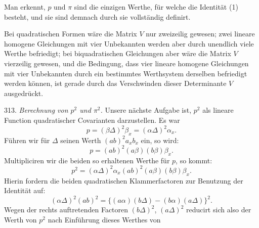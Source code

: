 \documentclass[11pt]{article}
\let\Delta\varDelta
\begin{document}
Man erkennt, $p$ und $\pi$ sind die einzigen Werthe, für welche die
Identität (1) besteht, und sie sind demnach durch sie vollständig
definirt.

Bei quadratischen Formen wäre die Matrix $V$ nur zweizeilig gewesen;
zwei lineare homogene Gleichungen mit vier Unbekannten werden aber
durch unendlich viele Werthe befriedigt; bei biquadratischen
Gleichungen aber wäre die Matrix $V$ vierzeilig gewesen, und die
Bedingung, dass vier lineare homogene Gleichungen mit vier Unbekannten
durch ein bestimmtes Werthsystem derselben befriedigt werden können,
ist gerade durch das Verschwinden dieser Determinante $V$ ausgedrückt.

313. \textit{Berechnung von $p^2$ und $\pi^2$.} Unsere nächste Aufgabe
ist, $p^2$ als lineare Function quadratischer Covarianten
darzustellen. Es war
\[
p = (\beta\Delta)^2\beta_x = (\alpha\Delta)^2\alpha_x.
\]
Führen wir für $\Delta$ seinen Werth $(ab)^2a_xb_x$ ein, so wird:
\[
p = (ab)^2(a\beta)(b\beta)\beta_x.
\]
Multipliciren wir die beiden so erhaltenen Werthe für $p$, so kommt:
\[
p^2 = (\alpha\Delta)^2\alpha_x(ab)^2(a\beta)(b\beta)\beta_x.
\]
Hierin fordern die beiden quadratischen Klammerfactoren zur Benutzung
der Identität auf:
\[
(\alpha\Delta)^2(ab)^2 = \{(a\alpha)(b\Delta) - (b\alpha)(a\Delta)\}^2.
\]
Wegen der rechts auftretenden Factoren $(b\Delta)^2$, $(a\Delta)^2$
reducirt sich also der Werth von $p^2$ nach Einführung dieses Werthes
von
\end{document}
